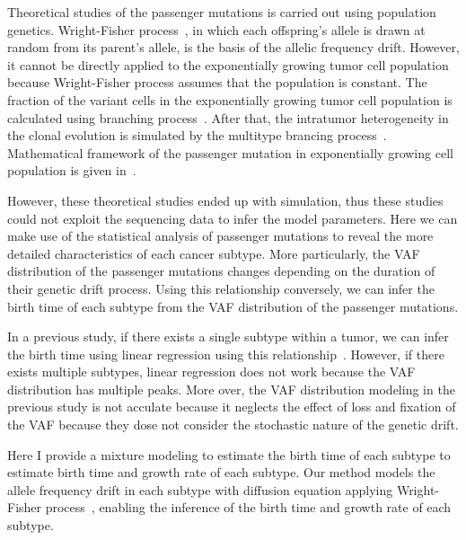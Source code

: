 \documentclass{article}
\begin{document}
Theoretical studies of the passenger mutations is carried out using population genetics. Wright-Fisher process~\cite{wright1931evolution}, in which each offspring's allele is drawn at random from its parent's allele, is the basis of the allelic frequency drift. However, it cannot be directly applied to the exponentially growing tumor cell population because Wright-Fisher process assumes that the population is constant. The fraction of the variant cells in the exponentially growing tumor cell population is calculated using branching process~\cite{iwasa2006evolution}.
After that, the intratumor heterogeneity in the clonal evolution is simulated by the multitype brancing process~\cite{durrett2011intratumor}. Mathematical framework of the passenger mutation in exponentially growing cell population is given in~\cite{durrett2013population}.

However, these theoretical studies ended up with simulation, thus these studies could not exploit the sequencing data to infer the model parameters.
Here we can make use of the statistical analysis of passenger mutations to reveal the more detailed characteristics of each cancer subtype.
More particularly, the VAF distribution of the passenger mutations changes depending on the duration of their genetic drift process.
Using this relationship conversely, we can infer the birth time of each subtype from the VAF distribution of the passenger mutations.


In a previous study, if there exists a single subtype within a tumor, we can infer the birth time using linear regression using this relationship~\cite{williams2016identification}.
However, if there exists multiple subtypes, linear regression does not work because the VAF distribution has multiple peaks.
More over, the VAF distribution modeling in the previous study is not acculate because it neglects the effect of loss and fixation of the VAF because they dose not consider the stochastic nature of the genetic drift.

Here I provide a mixture modeling to estimate the birth time of each subtype to estimate birth time and growth rate of each subtype.
Our method models the allele frequency drift in each subtype with diffusion equation applying Wright-Fisher process~\cite{wright1931evolution}, enabling the inference of the birth time and growth rate of each subtype.
\end{document}
